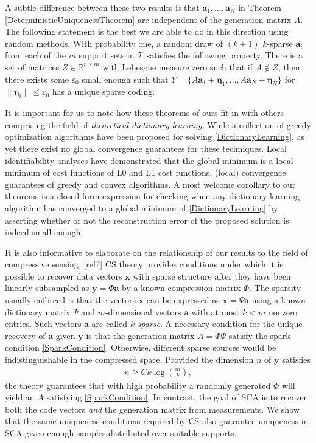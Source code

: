 \documentclass[journal, onecolumn]{IEEEtran}
\begin{document}
A subtle difference between these two results is that $\mathbf{a}_1, \ldots, \mathbf{a}_N$ in Theorem \ref{DeterministicUniquenessTheorem} are independent of the generation matrix $A$. The following statement is the best we are able to do in this direction using random methods. With probability one, a random draw of $(k+1)$ $k$-sparse $\mathbf{a}_i$ from each of the $m$ support sets in $\mathcal{T}$ satisfies the following property. There is a set of matrices $Z \in \mathbb{R}^{n \times m}$ with Lebesgue measure zero such that if $A \notin Z$, then there exists some $\varepsilon_0$ small enough such that $Y = \{A\mathbf{a}_1 + \mathbf{\eta}_1, \ldots, A\mathbf{a}_N + \mathbf{\eta}_N\}$ for $\|\mathbf{\eta}_i\| \leq \varepsilon_0$ has a unique sparse coding.

It is important for us to note how these theorems of ours fit in with others comprising the field of \emph{theoretical dictionary learning}. While a collection of greedy optimization algorithms have been proposed for solving \eqref{DictionaryLearning}, as yet there exist no global convergence guarantees for these techniques. Local identifiability analyses have demonstrated that the global minimum is a local minimum of cost functions of L0 and L1 cost functions, (local) convergence guarantees of greedy and convex algorithms. A most welcome corollary to our theorems is a closed form expression for checking when any dictionary learning algorithm has converged to a global minimum of \eqref{DictionaryLearning} by asserting whether or not the reconstruction error of the proposed solution is indeed small enough. 

It is also informative to elaborate on the relationship of our results to the field of compressive sensing. [ref?] CS theory provides conditions under which it is possible to recover data vectors $\mathbf{x}$ with sparse structure after they have been linearly subsampled as $\mathbf{y} = \Phi \mathbf{a}$ by a known compression matrix $\Phi$. The sparsity usually enforced is that the vectors $\mathbf{x}$ can be expressed as $\mathbf{x} = \Psi\mathbf{a}$ using a known dictionary matrix $\Psi$ and $m$-dimensional vectors $\mathbf{a}$ with at most $k < m$ nonzero entries. Such vectors $\mathbf{a}$ are called $k$-\emph{sparse}. A necessary condition for the unique recovery of $\mathbf{a}$ given $\mathbf{y}$ is that the generation matrix $A = \Phi\Psi$ satisfy the spark condition \eqref{SparkCondition}. Otherwise, different sparse sources would be indistinguishable in the compressed space. Provided the dimension $n$ of $\mathbf{y}$ satisfies
\begin{align}\label{CScondition}
n \geq Ck\log\left(\frac{m}{k}\right),
\end{align}
%
the theory guarantees that with high probability a randomly generated $\Phi$ will yield an $A$ satisfying \eqref{SparkCondition}. In contrast, the goal of SCA is to recover both the code vectors \emph{and} the generation matrix from measurements. We show that the same uniqueness conditions required by CS also guarantee uniqueness in SCA given enough samples distributed over suitable supports.
\end{document}
